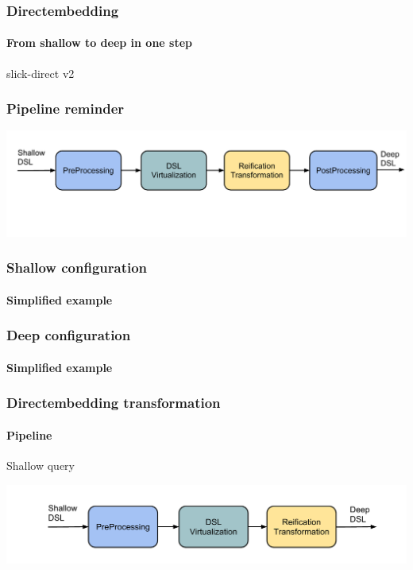 \documentclass[xcolor=dvipsnames]{beamer}
\theoremstyle{definition}
\begin{document}
\begin{frame}[fragile]
    \frametitle{Directembedding}
    \framesubtitle{From shallow to deep in one step}
    \begin{center}
        \Huge
        slick-direct v2
    \end{center}
\end{frame}

\begin{frame}[fragile]
    \frametitle{Pipeline reminder}
    \begin{center}
        \includegraphics[width=\textwidth]{img/Architecture.pdf}
    \end{center}
\end{frame}

\begin{frame}[fragile]
    \frametitle{Shallow configuration}
    \framesubtitle{Simplified example}
    \begin{block}{}
        
    \end{block}
\end{frame}

\begin{frame}[fragile]
    \frametitle{Deep configuration}
    \framesubtitle{Simplified example}
    \begin{block}{}
        
    \end{block}
\end{frame}


\begin{frame}[fragile]
    \frametitle{Directembedding transformation}
    \framesubtitle{Pipeline}
    \begin{block}{Shallow query}
        
    \end{block}
    \begin{center}
        \includegraphics[width=\textwidth]{img/pipeline1.pdf}
    \end{center}
\end{frame}
\end{document}
